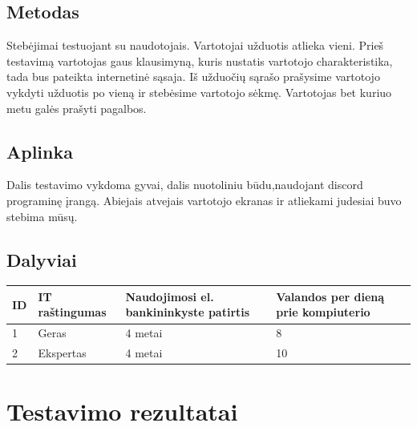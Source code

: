 \documentclass[oneside]{VUMIFPSkursinis}
\begin{document}
\subsection{Metodas}
Stebėjimai testuojant su naudotojais. Vartotojai užduotis atlieka vieni. Prieš testavimą vartotojas gaus klausimyną, kuris nustatis vartotojo charakteristika, tada bus pateikta internetinė sąsaja. Iš užduočių sąrašo prašysime vartotojo vykdyti užduotis po vieną ir stebėsime vartotojo sėkmę. Vartotojas bet kuriuo metu galės prašyti pagalbos. 
\subsection{Aplinka}
Dalis testavimo vykdoma gyvai, dalis nuotoliniu būdu,naudojant discord programinę įrangą. Abiejais atvejais vartotojo ekranas ir atliekami judesiai buvo stebima mūsų.
\subsection{Dalyviai}
\begin{center}
	\begin{tabular}{ |p{1cm} | p{3cm} | p{5cm} | p{5cm} |}
	\hline
ID&IT raštingumas & Naudojimosi el. bankininkyste patirtis & Valandos per dieną prie kompiuterio\\ \hline
1&Geras&4 metai&8 \\ \hline
2&Ekspertas&4 metai&10 \\ \hline
\end{tabular}
\end{center}

\section{Testavimo rezultatai}
\end{document}
